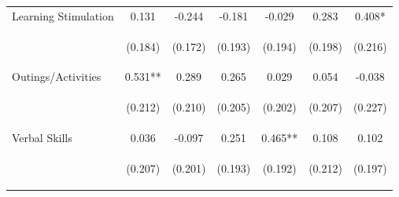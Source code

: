 \begin{tabular}{lcccccc}
\noalign{\smallskip}Learning Stimulation & 0.131 & -0.244 & -0.181 & -0.029 & 0.283 & 0.408*\\
 & \begin{footnotesize}(0.184)\end{footnotesize} & \begin{footnotesize}(0.172)\end{footnotesize} & \begin{footnotesize}(0.193)\end{footnotesize} & \begin{footnotesize}(0.194)\end{footnotesize} & \begin{footnotesize}(0.198)\end{footnotesize} & \begin{footnotesize}(0.216)\end{footnotesize}\\
\noalign{\smallskip}Outings/Activities & 0.531** & 0.289 & 0.265 & 0.029 & 0.054 & -0.038\\
 & \begin{footnotesize}(0.212)\end{footnotesize} & \begin{footnotesize}(0.210)\end{footnotesize} & \begin{footnotesize}(0.205)\end{footnotesize} & \begin{footnotesize}(0.202)\end{footnotesize} & \begin{footnotesize}(0.207)\end{footnotesize} & \begin{footnotesize}(0.227)\end{footnotesize}\\
\noalign{\smallskip}Verbal Skills & 0.036 & -0.097 & 0.251 & 0.465** & 0.108 & 0.102\\
 & \begin{footnotesize}(0.207)\end{footnotesize} & \begin{footnotesize}(0.201)\end{footnotesize} & \begin{footnotesize}(0.193)\end{footnotesize} & \begin{footnotesize}(0.192)\end{footnotesize} & \begin{footnotesize}(0.212)\end{footnotesize} & \begin{footnotesize}(0.197)\end{footnotesize}\\

\end{tabular}
